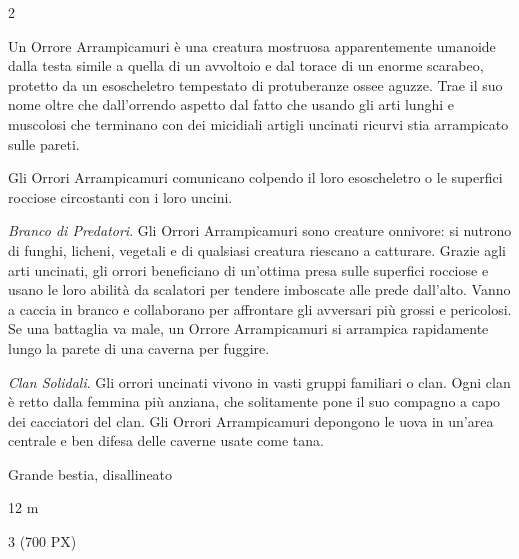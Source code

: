 \begin{multicols}{2}
{Un Orrore Arrampicamuri è una creatura mostruosa apparentemente umanoide dalla testa simile a quella di un avvoltoio e dal torace di un enorme scarabeo, protetto da un esoscheletro tempestato di protuberanze ossee aguzze. Trae il suo nome oltre che dall'orrendo aspetto dal fatto che usando gli arti lunghi e muscolosi che terminano con dei micidiali artigli uncinati ricurvi stia arrampicato sulle pareti.

Gli Orrori Arrampicamuri comunicano colpendo il loro esoscheletro o le superfici rocciose circostanti con i loro uncini.

\emph{Branco di Predatori}. Gli Orrori Arrampicamuri sono creature onnivore: si nutrono di funghi, licheni, vegetali e di qualsiasi creatura riescano a catturare. Grazie agli arti uncinati, gli orrori beneficiano di un'ottima presa sulle superfici rocciose e usano le loro abilità da scalatori per tendere imboscate alle prede dall'alto. Vanno a caccia in branco e collaborano per affrontare gli avversari più grossi e pericolosi. Se una battaglia va male, un Orrore Arrampicamuri si arrampica rapidamente lungo la parete di una caverna per fuggire.

\emph{Clan Solidali}. Gli orrori uncinati vivono in vasti gruppi familiari o clan. Ogni clan è retto dalla femmina più anziana, che solitamente pone il suo compagno a capo dei cacciatori del clan. Gli Orrori Arrampicamuri depongono le uova in un'area centrale e ben difesa delle caverne usate come tana.

\begin{description}[noitemsep, topsep=0pt, parsep=0pt, partopsep=0pt, itemsep=1pt, leftmargin=2.35cm,  labelwidth=2.2cm, itemindent=0cm, listparindent=0pt] %
\setlength{\baselineskip}{10pt}
\item[\textbf{Taglia/Tipo}] Grande bestia, disallineato
\item[\textbf{Caratt.}] 
\item[\textbf{Punti Ferita}] 
\item[\textbf{Movimento}] 12 m
\item[\textbf{Tiri Salvez.}] 
\item[\textbf{Sensi}] 
\item[\textbf{Sfida}] 3 (700 PX)
\end{description}
\smallskip

}
\end{multicols}
